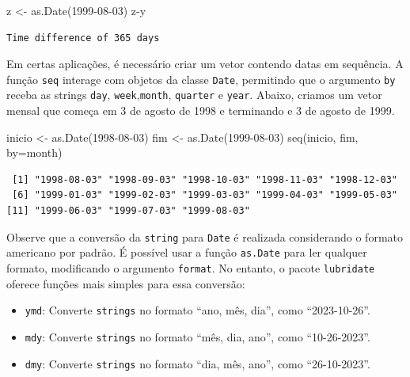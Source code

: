 \documentclass[
  letterpaper,
  DIV=11,
  numbers=noendperiod]{scrartcl}
\newenvironment{Shaded}{\begin{snugshade}}{\end{snugshade}}
\newcommand{\AttributeTok}[1]{\textcolor[rgb]{0.40,0.45,0.13}{#1}}
\newcommand{\FunctionTok}[1]{\textcolor[rgb]{0.28,0.35,0.67}{#1}}
\newcommand{\NormalTok}[1]{\textcolor[rgb]{0.00,0.23,0.31}{#1}}
\newcommand{\OtherTok}[1]{\textcolor[rgb]{0.00,0.23,0.31}{#1}}
\newcommand{\SpecialCharTok}[1]{\textcolor[rgb]{0.37,0.37,0.37}{#1}}
\newcommand{\StringTok}[1]{\textcolor[rgb]{0.13,0.47,0.30}{#1}}
\theoremstyle{definition}
\theoremstyle{definition}
\theoremstyle{plain}
\theoremstyle{plain}
\theoremstyle{remark}
\begin{document}
\begin{Shaded}
\begin{Highlighting}[]
\NormalTok{z }\OtherTok{\textless{}{-}} \FunctionTok{as.Date}\NormalTok{(}\StringTok{\textquotesingle{}1999{-}08{-}03\textquotesingle{}}\NormalTok{)}
\NormalTok{z}\SpecialCharTok{{-}}\NormalTok{y}
\end{Highlighting}
\end{Shaded}

\begin{verbatim}
Time difference of 365 days
\end{verbatim}

Em certas aplicações, é necessário criar um vetor contendo datas em
sequência. A função \texttt{seq} interage com objetos da classe
\texttt{Date}, permitindo que o argumento \texttt{by} receba as strings
\texttt{day}, \texttt{week},\texttt{month}, \texttt{quarter} e
\texttt{year}. Abaixo, criamos um vetor mensal que começa em 3 de agosto
de 1998 e terminando e 3 de agosto de 1999.

\begin{Shaded}
\begin{Highlighting}[]
\NormalTok{inicio }\OtherTok{\textless{}{-}} \FunctionTok{as.Date}\NormalTok{(}\StringTok{\textquotesingle{}1998{-}08{-}03\textquotesingle{}}\NormalTok{)}
\NormalTok{fim }\OtherTok{\textless{}{-}} \FunctionTok{as.Date}\NormalTok{(}\StringTok{\textquotesingle{}1999{-}08{-}03\textquotesingle{}}\NormalTok{)}
\FunctionTok{seq}\NormalTok{(inicio, fim, }\AttributeTok{by=}\StringTok{\textquotesingle{}month\textquotesingle{}}\NormalTok{)}
\end{Highlighting}
\end{Shaded}

\begin{verbatim}
 [1] "1998-08-03" "1998-09-03" "1998-10-03" "1998-11-03" "1998-12-03"
 [6] "1999-01-03" "1999-02-03" "1999-03-03" "1999-04-03" "1999-05-03"
[11] "1999-06-03" "1999-07-03" "1999-08-03"
\end{verbatim}

Observe que a conversão da \texttt{string} para \texttt{Date} é
realizada considerando o formato americano por padrão. É possível usar a
função \texttt{as.Date} para ler qualquer formato, modificando o
argumento \texttt{format}. No entanto, o pacote \texttt{lubridate}
oferece funções mais simples para essa conversão:

\begin{itemize}
\item
  \texttt{ymd}: Converte \texttt{strings} no formato ``ano, mês, dia'',
  como ``2023-10-26''.
\item
  \texttt{mdy}: Converte \texttt{strings} no formato ``mês, dia, ano'',
  como ``10-26-2023''.
\item
  \texttt{dmy}: Converte \texttt{strings} no formato ``dia, mês, ano'',
  como ``26-10-2023''.
\end{itemize}
\end{document}
